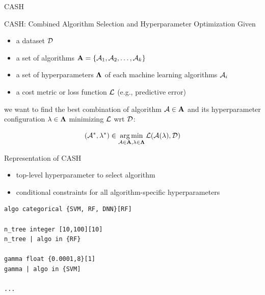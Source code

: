 \begin{frame}[c]{CASH }

\begin{block}{CASH: Combined Algorithm Selection and Hyperparameter Optimization}
Given
\begin{itemize}
  \item a dataset $\mathcal{D}$
  \item a set of algorithms $\mathbf{A} = \{\mathcal{A}_1, \mathcal{A}_2, \ldots, \mathcal{A}_k\}$
  \item a set of hyperparameters $\mathbf{\Lambda}$ of each machine learning algorithms $\mathcal{A}_i$
  \item a cost metric or loss function $\mathcal{L}$ (e.g., predictive error)
\end{itemize}
we want to find the best combination of algorithm $\mathcal{A} \in \mathbf{A}$ and its hyperparameter configuration $\mathbf{\lambda} \in \mathbf{\Lambda}$ minimizing $\mathcal{L}$ wrt $\mathcal{D}$:

\begin{equation}
(\mathcal{A}^*, \mathbf{\lambda}^*) \in \operatorname*{arg\,min}_{\mathcal{A} \in \mathbf{A}, \mathbf{\lambda} \in \mathbf{\Lambda}} \mathcal{L}(\mathcal{A}(\mathbf{\lambda}), \mathcal{D}) \nonumber
\end{equation}

\end{block}

\end{frame}
\begin{frame}[c, fragile]{Representation of CASH}

\begin{itemize}
  \item top-level hyperparameter to select algorithm
  \item conditional constraints for all algorithm-specific hyperparameters
\end{itemize}

\pause

\begin{verbatim}
algo categorical {SVM, RF, DNN}[RF]

n_tree integer [10,100][10]
n_tree | algo in {RF}

gamma float {0.0001,8}[1]
gamma | algo in {SVM]

...
\end{verbatim}

\end{frame}
